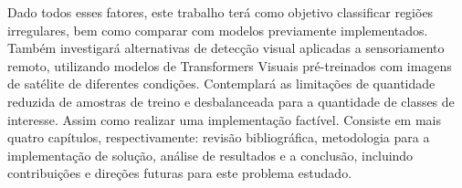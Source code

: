Dado todos esses fatores, este trabalho terá como objetivo classificar regiões irregulares, bem como comparar com modelos previamente implementados. Também investigará alternativas de detecção visual aplicadas a sensoriamento remoto, utilizando modelos de Transformers Visuais pré-treinados com imagens de satélite de diferentes condições. Contemplará as limitações de quantidade reduzida de amostras de treino e desbalanceada para a quantidade de classes de interesse. Assim como realizar uma implementação factível. Consiste em mais quatro capítulos, respectivamente: revisão bibliográfica, metodologia para a implementação de solução, análise de resultados e a conclusão, incluindo contribuições e direções futuras para este problema estudado.




